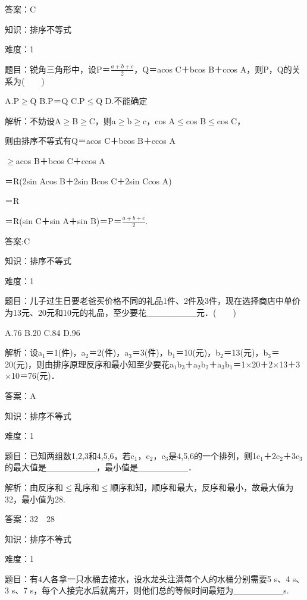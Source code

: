 \documentclass{article} %
\begin{document}
 答案：C

 

 知识：排序不等式

 难度：1

 题目：锐角三角形中，设P＝$\frac{a+b+c}{2}$，Q＝acos C＋bcos B＋ccos A，则P，Q的关系为(　　)

A.P$\mathrm{\ge}$Q  B.P＝Q  C.P$\mathrm{\le}$Q  D.不能确定

 解析：不妨设A$\mathrm{\ge}$B$\mathrm{\ge}$C，则a$\mathrm{\ge}$b$\mathrm{\ge}$c，cos A$\mathrm{\le}$cos B$\mathrm{\le}$cos C，

则由排序不等式有Q＝acos C＋bcos B＋ccos A

$\mathrm{\ge}$acos B＋bcos C＋ccos A

＝R(2sin Acos B＋2sin Bcos C＋2sin Ccos A)

＝R

＝R(sin C＋sin A＋sin B)＝P＝$\frac{a+b+c}{2}$.

 答案:C

 

 知识：排序不等式

 难度：1

 题目：儿子过生日要老爸买价格不同的礼品1件、2件及3件，现在选择商店中单价为13元、20元和10元的礼品，至少要花\_\_\_\_\_\_\_\_元．(　　)

A.76  B.20  C.84  D.96

解析：设a${}_{1}$＝1(件)，a${}_{2}$＝2(件)，a${}_{3}$＝3(件)，b${}_{1}$＝10(元)，b${}_{2}$＝13(元)，b${}_{3}$＝20(元)，则由排序原理反序和最小知至少要花a${}_{1}$b${}_{3}$＋a${}_{2}$b${}_{2}$＋a${}_{3}$b${}_{1}$＝1$\mathrm{\times}$20＋2$\mathrm{\times}$13＋3$\mathrm{\times}$10＝76(元)．

 答案：A



 知识：排序不等式

 难度：1

 题目：已知两组数1,2,3和4,5,6，若c${}_{1}$，c${}_{2}$，c${}_{3}$是4,5,6的一个排列，则1c${}_{1}$＋2c${}_{2}$＋3c${}_{3}$的最大值是\_\_\_\_\_\_\_\_，最小值是\_\_\_\_\_\_\_\_．

 解析：由反序和$\mathrm{\le}$乱序和$\mathrm{\le}$顺序和知，顺序和最大，反序和最小，故最大值为32，最小值为28.

 答案：32　28

 

 知识：排序不等式

 难度：1

 题目：有4人各拿一只水桶去接水，设水龙头注满每个人的水桶分别需要5 s、4 s、3 s、7 s，每个人接完水后就离开，则他们总的等候时间最短为\_\_\_\_\_\_\_\_s.
\end{document}
